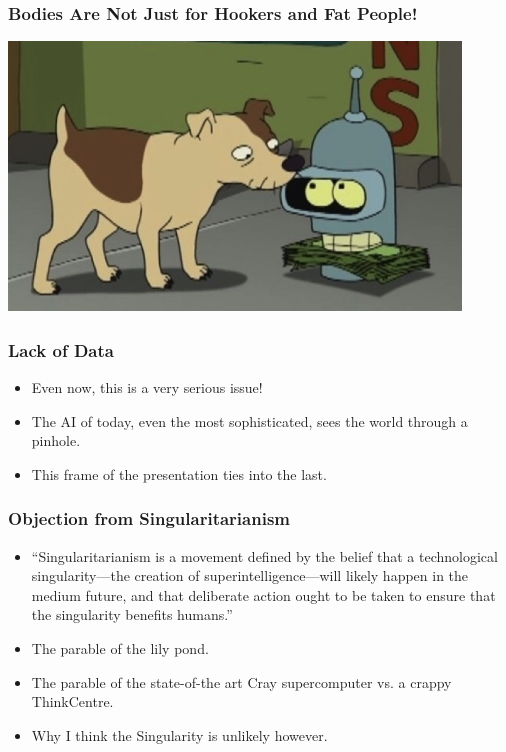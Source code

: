 \documentclass[10pt]{beamer}
\begin{document}
  \begin{frame}
    \frametitle{Bodies Are Not Just for Hookers and Fat People!}

    \includegraphics[width=0.9\textwidth]{bender-without-body.jpg}
  \end{frame}

  \begin{frame}
    \frametitle{Lack of Data}

    \begin{itemize}
      \item Even now, this is a very serious issue!
      \pause
      \item The AI of today, even the most sophisticated, sees the world
        through a pinhole.
      \pause
      \item This frame of the presentation ties into the last.
    \end{itemize}
  \end{frame}

  \begin{frame}
    \frametitle{Objection from Singularitarianism}

    \begin{itemize}
      \item ``Singularitarianism is a movement defined by the belief that a
        technological singularity---the creation of superintelligence---will
        likely happen in the medium future, and that deliberate action ought
        to be taken to ensure that the singularity benefits humans.''
      \pause
      \item The parable of the lily pond.
      \pause
      \item The parable of the state-of-the art Cray supercomputer vs. a
        crappy ThinkCentre.
      \pause
      \item Why I think the Singularity is unlikely however.
    \end{itemize}
  \end{frame}
\end{document}
